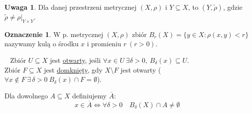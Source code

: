 \documentclass[twoside,10pt]{article}
\theoremstyle{definition}
\theoremstyle{definition}
\theoremstyle{definition}
\theoremstyle{definition}
\theoremstyle{remark}
\theoremstyle{definition}
\newtheorem*{uw}{Uwaga}
\theoremstyle{definition}
\theoremstyle{definition}
\newtheorem*{ozn}{Oznaczenie}
\theoremstyle{definition}
\theoremstyle{definition}
\theoremstyle{definition}
\begin{document}
\begin{uw} 
    Dla danej przestrzeni metrycznej $(X,\rho)$ i $Y \subseteq X$, to $(Y,\widetilde\rho)$, gdzie $\widetilde\rho \neq \rho |_{Y \times Y}$.
\end{uw}
\begin{ozn}
    W p. metrycznej $(X,\rho)$ zbiór $B_r(X) = \{y \in X: \rho(x,y) < r\}$ nazywamy kulą o środku $x$ i promieniu $r \ (r > 0)$.
\end{ozn}
\begin{df} ~\newline
    Zbiór $U \subseteq X$ jest \underline{otwarty}, jeśli $\forall x \in U \ \exists \delta > 0, \ B_\delta (x) \subseteq U$. \\ 
    Zbiór $F \subseteq X$ jest \underline{domknięty}, gdy $X \setminus F$ jest otwarty ($\forall x \notin F \ \exists \, \delta > 0 \ B_\delta(x) \cap F = \emptyset$).
\end{df} 
\begin{df} 
    Dla dowolnego $A \subseteq X$ definiujemy $\overline{A}$:
    \[ x \in \overline{A} \Leftrightarrow \forall \delta > 0 \quad B_\delta(X) \cap A \neq \emptyset \]
\end{df} 
\end{document}
